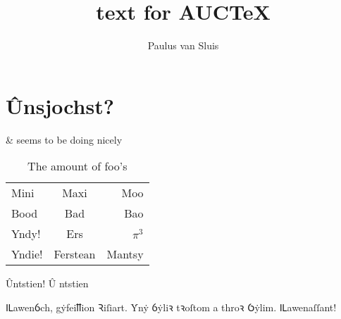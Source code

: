 \documentclass[a4paper]{memoir}
\title{text for AUC\TeX}
\author{Paulus van Sluis}
\begin{document}
\chapter{Ûnsjochst?}
\&   seems to be doing nicely

\begin{table}[h]
  \centering
  \begin{tabular}{lcr}\toprule
    Mini & Maxi & Moo\\
    Bood & Bad & Bao \\\midrule
    Yndy! & Ers & \(\pi^{3}\)\\
    Yndie! & Ferstean & Mantsy \\\bottomrule
  \end{tabular}
  \caption{The amount of foo's}
  \label{tab:foos}
\end{table}
Ûntstien! \^U%
ntstien

\autocite{harvey_aspects_1984}
\autocite{lewis_concise_1974}

Ỻawenỽch, gẏfeiỻion Ꝛiſiart. Ẏnẏ ỽẏliꝛ tꝛoſtom a throꝛ Ỽẏlim. Ỻawenaſſant!

\printbibliography
\end{document}

